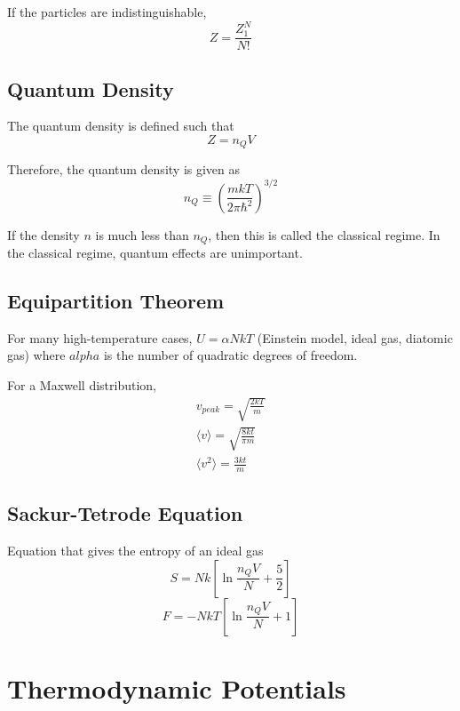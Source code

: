 \documentclass[11pt]{article}
\begin{document}
If the particles are indistinguishable,
\begin{equation}
    Z = \frac{Z_1^N}{N!}
\end{equation}


\subsection{Quantum Density}
The quantum density is defined such that
\begin{equation}
    Z = n_Q V
\end{equation}

Therefore, the quantum density is given as
\begin{equation}
    n_Q \equiv \left( \frac{mkT}{2\pi \hbar^2} \right)^{3/2}
\end{equation}

If the density $n$ is much less than $n_Q$, then this is called the classical regime. In the classical regime, quantum effects are unimportant.


\subsection{Equipartition Theorem}
For many high-temperature cases, $U = \alpha NkT$ (Einstein model, ideal gas, diatomic gas) where $alpha$ is the number of quadratic degrees of freedom.

For a Maxwell distribution,
\begin{align}
    v_{peak} = \sqrt{\frac{2kT}{m}} \\
    \langle v \rangle = \sqrt{\frac{8kt}{\pi m}} \\
    \langle v^2 \rangle = \frac{3kt}{m}
\end{align}

\subsection{Sackur-Tetrode Equation}
Equation that gives the entropy of an ideal gas
\begin{equation}
    S = Nk \left[ \ln{\frac{n_QV}{N}} + \frac{5}{2} \right]
\end{equation}
\begin{equation}
    F = - NkT \left[ \ln{\frac{n_QV}{N}} + 1 \right]
\end{equation}


\section{Thermodynamic Potentials}
\end{document}
